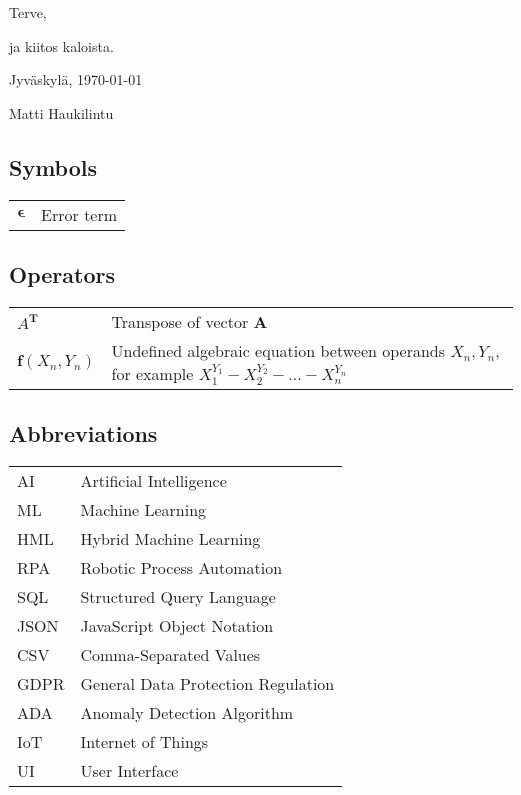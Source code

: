 \documentclass[english, 12pt, a4paper, elec, utf8, a-1b, online]{aaltothesis}
\begin{document}

Terve,

ja kiitos kaloista.

\vspace{5cm}
Jyväskylä, {\today}

\vspace{5mm}
{\hfill Matti Haukilintu \hspace{1cm}}

\newpage


\thesistableofcontents



\subsection*{Symbols}

\begin{tabular}{ll}
  $\mathbf{\epsilon}$  & Error term
\end{tabular}

\subsection*{Operators}

\begin{tabularx}{\textwidth}{l X}
  $A^{\mathbf{T}}$    & Transpose of vector $\mathbf{A}$ \\
  $\mathbf{f}(X_{n},Y_{n})$    & Undefined algebraic equation between operands $X_{n},Y_{n}$,
  for example $X_{1}^{Y_{1}}-X_{2}^{Y_{2}}-...-X_{n}^{Y_{n}}$
\end{tabularx}

\subsection*{Abbreviations}

\begin{tabular}{ll}
  AI          & Artificial Intelligence \\
  ML          & Machine Learning \\
  HML         & Hybrid Machine Learning \\
  RPA         & Robotic Process Automation \\
  SQL         & Structured Query Language \\
  JSON        & JavaScript Object Notation \\
  CSV         & Comma-Separated Values \\
  GDPR        & General Data Protection Regulation \\
  ADA         & Anomaly Detection Algorithm \\
  IoT         & Internet of Things \\
  UI          & User Interface
\end{tabular}
\end{document}
